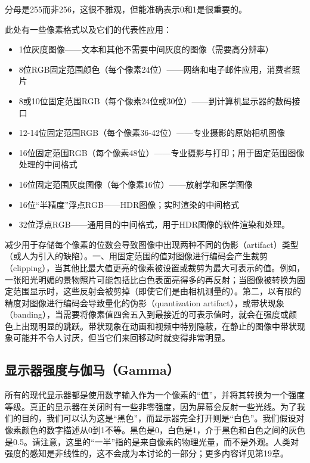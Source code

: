 \documentclass[lang=cn,12pt]{elegantbook}
\begin{document}
\begin{note}
  分母是255而非256，这很不雅观，但能准确表示0和1是很重要的。
\end{note}

此处有一些像素格式以及它们的代表性应用：

\begin{itemize}
  \item 1位灰度图像——文本和其他不需要中间灰度的图像（需要高分辨率）
  \item 8位RGB固定范围颜色（每个像素24位）——网络和电子邮件应用，消费者照片
  \item 8或10位固定范围RGB（每个像素24位或30位）——到计算机显示器的数码接口
  \item 12-14位固定范围RGB（每个像素36-42位）——专业摄影的原始相机图像
  \item 16位固定范围RGB（每个像素48位）——专业摄影与打印；用于固定范围图像处理的中间格式
  \item 16位固定范围灰度图像（每个像素16位）——放射学和医学图像
  \item 16位“半精度”浮点RGB——HDR图像；实时渲染的中间格式
  \item 32位浮点RGB——通用目的中间格式，用于HDR图像的软件渲染和处理。
\end{itemize}

减少用于存储每个像素的位数会导致图像中出现两种不同的伪影（artifact）类型（或人为引入的缺陷）。一、用固定范围的值对图像进行编码会产生裁剪（clipping），当其他比最大值更亮的像素被设置或裁剪为最大可表示的值。例如，一张阳光明媚的景物照片可能包括比白色表面亮得多的再反射；当图像被转换为固定范围显示时，这些反射会被剪掉（即使它们是由相机测量的）。第二，以有限的精度对图像进行编码会导致量化的伪影（quantization artifact），或带状现象（banding），当需要将像素值四舍五入到最接近的可表示值时，就会在强度或颜色上出现明显的跳跃。带状现象在动画和视频中特别隐蔽，在静止的图像中带状现象可能并不令人讨厌，但当它们来回移动时就变得非常明显。

\subsection{显示器强度与伽马（Gamma）}

所有的现代显示器都是使用数字输入作为一个像素的“值”，并将其转换为一个强度等级。真正的显示器在关闭时有一些非零强度，因为屏幕会反射一些光线。为了我们的目的，我们可以认为这是“黑色”，而显示器完全打开则是“白色”。我们假设对像素颜色的数字描述从0到1不等。黑色是0，白色是1，介于黑色和白色之间的灰色是0.5。请注意，这里的“一半”指的是来自像素的物理光量，而不是外观。人类对强度的感知是非线性的，这不会成为本讨论的一部分；更多内容详见第19章。
\end{document}
